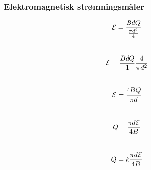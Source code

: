 \documentclass[aspectratio=169,xcolor=dvipsnames]{beamer}
\begin{document}
%
%
%
%
%
\begin{frame}
	\frametitle{Elektromagnetisk strømningsmåler}
$$\mathcal{E} = {BdQ \over {\pi d^2 \over 4}}$$
\\
$$\mathcal{E} = {BdQ \over 1} {4 \over {\pi d^2}}$$
\\
$$\mathcal{E} = {4BQ \over {\pi d}}$$
\\
$$Q = {\pi d \mathcal{E} \over 4B}$$
\\
$$Q = k {\pi d \mathcal{E} \over 4B}$$

\end{frame}
%
%
%
%
%
%
%
%
%
%
%
%
%
%
\end{document}
